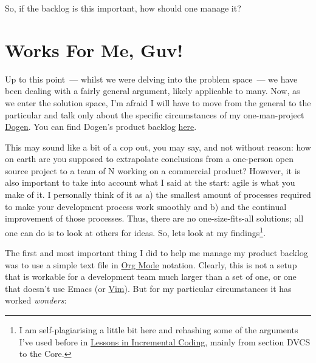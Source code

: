 \documentclass{book}
\begin{document}
So, if the backlog is this important, how should one manage it?

\section{Works For Me, Guv!}

Up to this point~--- whilst we were delving into the problem space~---
we have been dealing with a fairly general argument, likely applicable
to many. Now, as we enter the solution space, I'm afraid I will have
to move from the general to the particular and talk only about the
specific circumstances of my one-man-project
\href{https://github.com/DomainDrivenConsulting/dogen}{Dogen}. You can
find Dogen's product backlog
\href{https://github.com/DomainDrivenConsulting/dogen/blob/master/doc/agile/product_backlog.org}{here}.

This may sound like a bit of a cop out, you may say, and not without
reason: how on earth are you supposed to extrapolate conclusions from
a one-person open source project to a team of N working on a
commercial product? However, it is also important to take into account
what I said at the start: agile is what you make of it. I personally
think of it as a) the smallest amount of processes required to make
your development process work smoothly and b) and the continual
improvement of those processes. Thus, there are no one-size-fits-all
solutions; all one can do is to look at others for ideas. So, lets
look at my findings\footnote{I am self-plagiarising a little bit here and
rehashing some of the arguments I've used before in \href{http://mcraveiro.blogspot.co.uk/2014/09/nerd-food-dogen-lessons-in-incremental.html}{Lessons in
Incremental Coding}, mainly from section DVCS to the Core.}.

The first and most important thing I did to help me manage my product
backlog was to use a simple text file in \href{http://orgmode.org/}{Org Mode} notation. Clearly,
this is not a setup that is workable for a development team much
larger than a set of one, or one that doesn't use Emacs (or \href{https://github.com/hsitz/VimOrganizer}{Vim}). But
for my particular circumstances it has worked \emph{wonders}:
\end{document}
